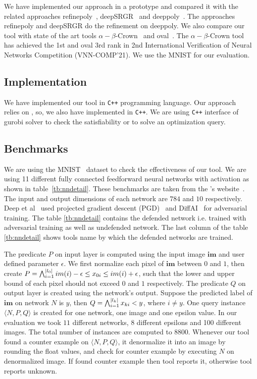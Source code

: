 We have implemented our approach in a prototype and compared it with the related 
approaches refinepoly~\cite{refinepoly}, deepSRGR~\cite{deepsrgr} and deeppoly~\cite{deeppoly}. 
The approaches refinepoly and deepSRGR do the refinement on deeppoly. We also compare 
our tool with state of the art tools $\alpha - \beta$-Crown~\cite{alphabetacrown} and oval~\cite{ovaltool}. 
The $\alpha - \beta$-Crown tool has achieved the 1st and oval 3rd rank in
2nd International Verification of Neural Networks Competition (VNN-COMP'21). 
We use the MNIST \cite{mnistdataset} for our evaluation.    
\subsection{Implementation}
We have implemented our tool in \texttt{C++} programming language. Our approach relies on \deeppoly{}, so, 
we also have implemented \deeppoly{} in \texttt{C++}. We are using \texttt{C++} interface of gurobi solver 
to check the satisfiability or to solve an optimization query. 

\subsection{Benchmarks}
We are using the MNIST~\cite{mnistdataset} dataset to check the effectiveness of our tool. 
We are using 11 different fully connected feedforward neural networks with \relu{} activation as shown in table~\ref{tb:nndetail}.
These benchmarks are taken from the \deeppoly{}'s website~\cite{erantool}. The input and output dimensions of each network 
are $784$ and $10$ respectively. Deep et al~\cite{deeppolyref} used projected gradient descent (PGD)~\cite{pgdref}
and DiffAI~\cite{diffairef} for adversarial training. The table \ref{tb:nndetail} contains the defended network i.e.
trained with adversarial training as well as undefended network. The last column of the table \ref{tb:nndetail}
shows tools name by which the defended networks are trained.  

The predicate $P$ on input layer is computed using the input image $\boldsymbol{im}$ and user defined parameter $\epsilon$. 
We first normalize each pixel of $\boldsymbol{im}$ between $0$ and $1$, then create 
$P = \bigwedge_{i=1}^{|l_0|} im(i)-\epsilon \leq x_{0i}\leq im(i)+\epsilon$, such that the lower and upper bound of each pixel
should not exceed $0$ and $1$ respectively. The predicate $Q$ on output layer is created using the network's output.    
Suppose the predicted label of $\boldsymbol{im}$ on network $N$ is $y$, then $Q = \bigwedge_{i=1}^{|l_k|} x_{ki} < y$, where $i \neq y$. 
One query instance $\langle N,P,Q \rangle$ is created for one network, one image and one epsilon value. 
In our evaluation we took $11$ different networks, 8 different epsilons and 100 different images. The 
total number of instances are computed to $8800$. Whenever our tool found a counter example on $\langle N,P,Q \rangle$,
it denormalize it into an image by rounding the float values, 
and check for counter example by executing $N$ on denormalized image.
If found counter example then tool reports it, otherwise tool reports unknown.



